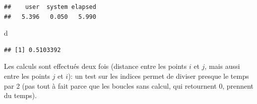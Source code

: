 \documentclass[
  11pt,
  french,
  a4paper,
  extrafontsizes,onecolumn,openright
  ]{memoir}
\newenvironment{Shaded}{\begin{snugshade}}{\end{snugshade}}
\newcommand{\ControlFlowTok}[1]{\textcolor[rgb]{0.13,0.29,0.53}{\textbf{#1}}}
\newcommand{\DecValTok}[1]{\textcolor[rgb]{0.00,0.00,0.81}{#1}}
\newcommand{\FunctionTok}[1]{\textcolor[rgb]{0.00,0.00,0.00}{#1}}
\newcommand{\NormalTok}[1]{#1}
\newcommand{\OtherTok}[1]{\textcolor[rgb]{0.56,0.35,0.01}{#1}}
\newcommand{\SpecialCharTok}[1]{\textcolor[rgb]{0.00,0.00,0.00}{#1}}
\begin{document}
\begin{verbatim}
##    user  system elapsed 
##   5.396   0.050   5.990
\end{verbatim}

\begin{Shaded}
\begin{Highlighting}[]
\NormalTok{d}
\end{Highlighting}
\end{Shaded}

\begin{verbatim}
## [1] 0.5103392
\end{verbatim}

\normalsize

Les calculs sont effectués deux fois (distance entre les points \(i\) et \(j\), mais aussi entre les points \(j\) et \(i\)): un test sur les indices permet de diviser presque le temps par 2 (pas tout à fait parce que les boucles sans calcul, qui retournent \(0\), prennent du temps).

\scriptsize

\begin{Shaded}
\end{Shaded}
\end{document}

